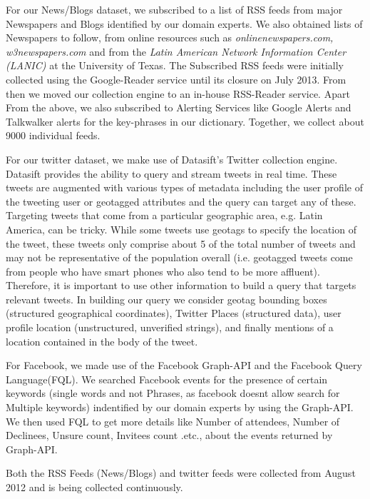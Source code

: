 For our News/Blogs dataset, we subscribed to a list of RSS feeds from major Newspapers and Blogs identified by our domain experts. We also obtained lists of Newspapers to follow, from online resources such as {\em onlinenewspapers.com, w3newspapers.com} and from the {\em Latin American Network Information Center (LANIC)} at the University of Texas. The Subscribed RSS feeds were initially collected using the Google-Reader service until its closure on July 2013. From then we moved our collection engine to an in-house RSS-Reader service. Apart From the above, we also subscribed to Alerting Services like Google Alerts and Talkwalker alerts for the key-phrases in our dictionary.
Together, we collect about 9000 individual feeds.

For our twitter dataset, we  make use of Datasift’s
Twitter collection engine. Datasift provides the ability to
query and stream tweets in real time. These tweets are
augmented with various types of metadata including the user
profile of the tweeting user or geotagged attributes and the
query can target any of these. Targeting tweets that come
from a particular geographic area, e.g. Latin America, can
be tricky. While some tweets use geotags to specify the
location of the tweet, these tweets only comprise about 5%
of the total number of tweets and may not be representative
of the population overall (i.e. geotagged tweets come from
people who have smart phones who also tend to be more
affluent). Therefore, it is important to use other information
to build a query that targets relevant tweets. In building
our query we consider geotag bounding boxes (structured
geographical coordinates), Twitter Places (structured data),
user profile location (unstructured, unverified strings), and
finally mentions of a location contained in the body of the
tweet.

For Facebook, we made use of the Facebook Graph-API and the Facebook Query Language(FQL). We searched Facebook events for the presence of certain keywords (single words and not Phrases, as facebook doesnt allow search for Multiple keywords) indentified by our domain experts by using the Graph-API. We then used FQL to get more details like Number of attendees, Number of Declinees, Unsure count, Invitees count .etc., about the events returned by Graph-API.


Both the RSS Feeds (News/Blogs) and twitter feeds were collected from August 2012 and is being collected continuously.
